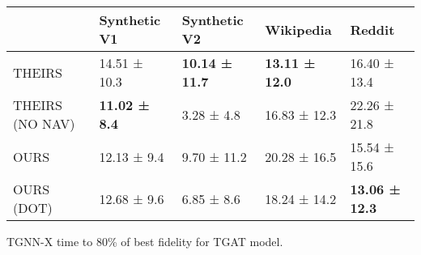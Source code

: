 \begin{tabular}{lllll}
\toprule
 & Synthetic V1 & Synthetic V2 & Wikipedia & Reddit \\
\midrule
THEIRS & 14.51 ± 10.3 & \bfseries 10.14 ± 11.7 & \bfseries 13.11 ± 12.0 & 16.40 ± 13.4 \\
THEIRS (NO NAV) & \bfseries 11.02 ± 8.4 & 3.28 ± 4.8 & 16.83 ± 12.3 & 22.26 ± 21.8 \\
OURS & 12.13 ± 9.4 & 9.70 ± 11.2 & 20.28 ± 16.5 & 15.54 ± 15.6 \\
OURS (DOT) & 12.68 ± 9.6 & 6.85 ± 8.6 & 18.24 ± 14.2 & \bfseries 13.06 ± 12.3 \\
\bottomrule
\end{tabular}
\caption{\label{tab:tgat_time}TGNN-X time to 80\% of best fidelity for TGAT model.}

